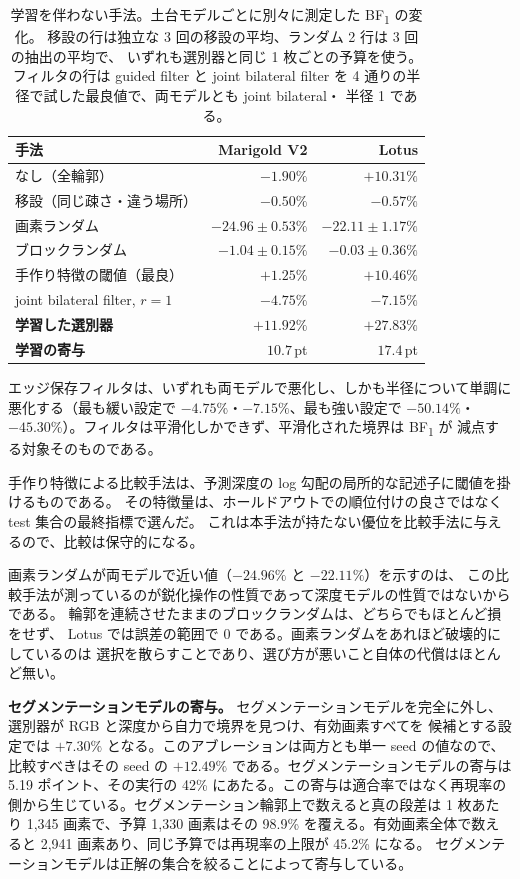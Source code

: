 \documentclass[conference]{IEEEtran}
\newcommand{\bfone}{BF\textsubscript{1}}
\begin{document}
\begin{table}[t]
\caption{学習を伴わない手法。土台モデルごとに別々に測定した \bfone{} の変化。
移設の行は独立な 3 回の移設の平均、ランダム 2 行は 3 回の抽出の平均で、
いずれも選別器と同じ 1 枚ごとの予算を使う。フィルタの行は guided filter と
joint bilateral filter を 4 通りの半径で試した最良値で、両モデルとも joint bilateral・
半径 1 である。}
\label{tab:controls}
\centering
\begin{tabular}{lrr}
\toprule
手法 & Marigold V2 & Lotus \\
\midrule
なし（全輪郭） & $-1.90\%$ & $+10.31\%$ \\
移設（同じ疎さ・違う場所） & $-0.50\%$ & $-0.57\%$ \\
画素ランダム & $-24.96 \pm 0.53\%$ & $-22.11 \pm 1.17\%$ \\
ブロックランダム & $-1.04 \pm 0.15\%$ & $-0.03 \pm 0.36\%$ \\
手作り特徴の閾値（最良） & $+1.25\%$ & $+10.46\%$ \\
\midrule
joint bilateral filter, $r{=}1$ & $-4.75\%$ & $-7.15\%$ \\
\midrule
\textbf{学習した選別器} & $\mathbf{+11.92\%}$ & $\mathbf{+27.83\%}$ \\
\textbf{学習の寄与} & $\mathbf{10.7}$\,pt & $\mathbf{17.4}$\,pt \\
\bottomrule
\end{tabular}
\end{table}

エッジ保存フィルタは、いずれも両モデルで悪化し、しかも半径について単調に悪化する（最も緩い設定で
$-4.75\%$・$-7.15\%$、最も強い設定で $-50.14\%$・$-45.30\%$）。フィルタは平滑化しかできず、平滑化された境界は \bfone{} が
減点する対象そのものである。

手作り特徴による比較手法は、予測深度の log 勾配の局所的な記述子に閾値を掛けるものである。
その特徴量は、ホールドアウトでの順位付けの良さではなくtest 集合の最終指標で選んだ。
これは本手法が持たない優位を比較手法に与えるので、比較は保守的になる。

画素ランダムが両モデルで近い値（$-24.96\%$ と $-22.11\%$）を示すのは、
この比較手法が測っているのが鋭化操作の性質であって深度モデルの性質ではないからである。
輪郭を連続させたままのブロックランダムは、どちらでもほとんど損をせず、
Lotus では誤差の範囲で 0 である。画素ランダムをあれほど破壊的にしているのは
選択を散らすことであり、選び方が悪いこと自体の代償はほとんど無い。

\textbf{セグメンテーションモデルの寄与。} セグメンテーションモデルを完全に外し、選別器が RGB と深度から自力で境界を見つけ、有効画素すべてを
候補とする設定では $+7.30\%$ となる。このアブレーションは両方とも単一 seed の値なので、
比較すべきはその seed の $+12.49\%$ である。セグメンテーションモデルの寄与は 5.19 ポイント、その実行の 42\%
にあたる。この寄与は適合率ではなく再現率の側から生じている。セグメンテーション輪郭上で数えると真の段差は
1 枚あたり 1{,}345 画素で、予算 1{,}330 画素はその 98.9\% を覆える。有効画素全体で数えると
2{,}941 画素あり、同じ予算では再現率の上限が 45.2\% になる。
セグメンテーションモデルは正解の集合を絞ることによって寄与している。
\end{document}
